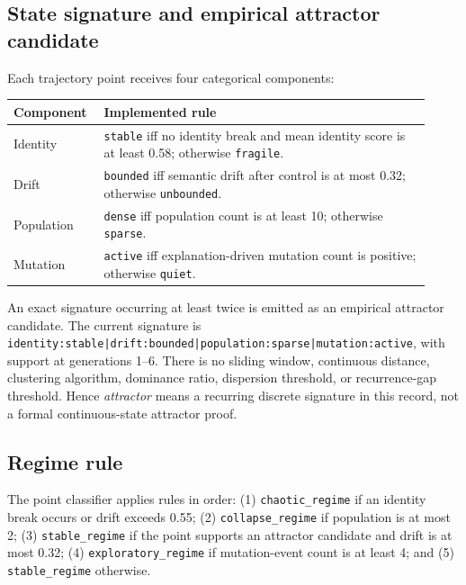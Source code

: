 \documentclass[10pt]{article}
\begin{document}
\newpage
\begin{samepage}
\subsection{State signature and empirical attractor candidate}

Each trajectory point receives four categorical components:

{\small
\begin{center}
\begin{tabular}{@{}>{\raggedright\arraybackslash}p{0.18\linewidth}p{0.74\linewidth}@{}}
\toprule
Component & Implemented rule \\
\midrule
Identity & \texttt{stable} iff no identity break and mean identity score is at least 0.58; otherwise \texttt{fragile}. \\
Drift & \texttt{bounded} iff semantic drift after control is at most 0.32; otherwise \texttt{unbounded}. \\
Population & \texttt{dense} iff population count is at least 10; otherwise \texttt{sparse}. \\
Mutation & \texttt{active} iff explanation-driven mutation count is positive; otherwise \texttt{quiet}. \\
\bottomrule
\end{tabular}
\end{center}
}

An exact signature occurring at least twice is emitted as an empirical
attractor candidate. The current signature is
\texttt{identity:stable|drift:bounded|population:sparse|mutation:active}, with
support at generations 1--6. There is no sliding window, continuous distance,
clustering algorithm, dominance ratio, dispersion threshold, or recurrence-gap
threshold. Hence \emph{attractor} means a recurring discrete signature in this
record, not a formal continuous-state attractor proof.
\end{samepage}

\subsection{Regime rule}

The point classifier applies rules in order: (1) \texttt{chaotic\_regime} if
an identity break occurs or drift exceeds 0.55; (2) \texttt{collapse\_regime}
if population is at most 2; (3) \texttt{stable\_regime} if the point supports
an attractor candidate and drift is at most 0.32; (4)
\texttt{exploratory\_regime} if mutation-event count is at least 4; and (5)
\texttt{stable\_regime} otherwise.
\end{document}
